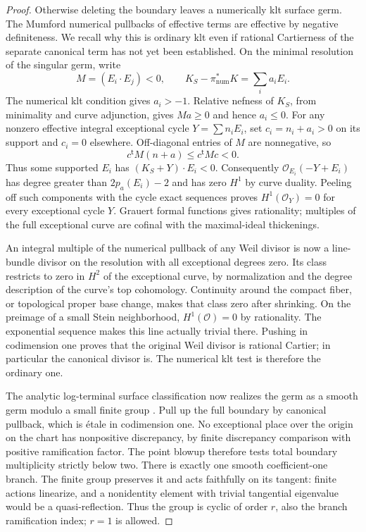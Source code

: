 \documentclass[11pt,letterpaper]{article}
\newcommand{\OO}{\mathcal{O}}
\theoremstyle{definition}
\theoremstyle{remark}
\begin{document}
\begin{proof}
Otherwise deleting the boundary leaves a numerically klt surface
germ.  The Mumford numerical pullbacks of effective terms are
effective by negative definiteness.  We recall why this is ordinary
klt even if rational Cartierness of the separate canonical term has
not yet been established.  On the minimal resolution of the
singular germ, write
\[
 M=(E_i\cdot E_j)<0,\qquad
 K_S-\pi^*_{\mathrm{num}}K=\sum_i a_iE_i.
\]
The numerical klt condition gives $a_i>-1$.  Relative nefness of
$K_S$, from minimality and curve adjunction, gives $Ma\geq0$ and
hence $a_i\leq0$.  For any nonzero effective integral exceptional
cycle $Y=\sum n_iE_i$, set $c_i=n_i+a_i>0$ on its support and
$c_i=0$ elsewhere.  Off-diagonal entries of $M$ are nonnegative, so
\begin{equation}
 c^{\mathsf t}M(n+a)\leq c^{\mathsf t}Mc<0.
 \label{bir:numerical-surface}
\end{equation}
Thus some supported $E_i$ has $(K_S+Y)\cdot E_i<0$.
Consequently $\OO_{E_i}(-Y+E_i)$ has degree greater than
$2p_a(E_i)-2$ and has zero $H^1$ by curve duality.  Peeling off such
components with the cycle exact sequences proves
$H^1(\OO_Y)=0$ for every exceptional cycle $Y$.  Grauert formal
functions gives rationality; multiples of the full exceptional
curve are cofinal with the maximal-ideal thickenings.

An integral multiple of the numerical pullback of any Weil divisor
is now a line-bundle divisor on the resolution with all exceptional
degrees zero.  Its class restricts to zero in $H^2$ of the
exceptional curve, by normalization and the degree description of
the curve's top cohomology.  Continuity around the compact fiber,
or topological proper base change, makes that class zero after
shrinking.  On the preimage of a small Stein neighborhood,
$H^1(\OO)=0$ by rationality.  The exponential sequence makes this
line actually trivial there.  Pushing in codimension one proves
that the original Weil divisor is rational Cartier; in particular
the canonical divisor is.  The numerical klt test is therefore the
ordinary one.

The analytic log-terminal surface classification now realizes the
germ as a smooth germ modulo a small finite group
\cite[Chapter~4]{BirationalGeometry}.  Pull up the full boundary by
canonical pullback, which is \mbox{\'etale} in codimension one.  No
exceptional place over the origin on the chart has nonpositive
discrepancy, by finite discrepancy comparison with positive
ramification factor.  The point blowup therefore tests total
boundary multiplicity strictly below two.  There is exactly one
smooth coefficient-one branch.  The finite group preserves it and
acts faithfully on its tangent: finite actions linearize, and a
nonidentity element with trivial tangential eigenvalue would be a
quasi-reflection.  Thus the group is cyclic of order $r$, also the
branch ramification index; $r=1$ is allowed.


\end{proof}
\end{document}
